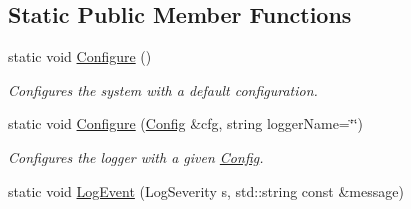 \subsection*{Static Public Member Functions}
\begin{DoxyCompactItemize}
\item 
static void \hyperlink{class_common_1_1_syslog_a21332be0f2687c9c49bdd43b1e953482}{Configure} ()
\begin{DoxyCompactList}\small\item\em Configures the system with a default configuration. \end{DoxyCompactList}\item 
\hypertarget{class_common_1_1_syslog_a6fe252be1940bf80fe602a52a5ed7d97}{static void \hyperlink{class_common_1_1_syslog_a6fe252be1940bf80fe602a52a5ed7d97}{Configure} (\hyperlink{class_common_1_1_config}{Config} \&cfg, string logger\-Name=\char`\"{}\char`\"{})}\label{class_common_1_1_syslog_a6fe252be1940bf80fe602a52a5ed7d97}

\begin{DoxyCompactList}\small\item\em Configures the logger with a given \hyperlink{class_common_1_1_config}{Config}. \end{DoxyCompactList}\item 
\hypertarget{class_common_1_1_syslog_a528fee777324dc5d821f727b5398e77e}{static void \hyperlink{class_common_1_1_syslog_a528fee777324dc5d821f727b5398e77e}{Log\-Event} (Log\-Severity s, std\-::string const \&message)}\label{class_common_1_1_syslog_a528fee777324dc5d821f727b5398e77e}


\end{DoxyCompactItemize}

